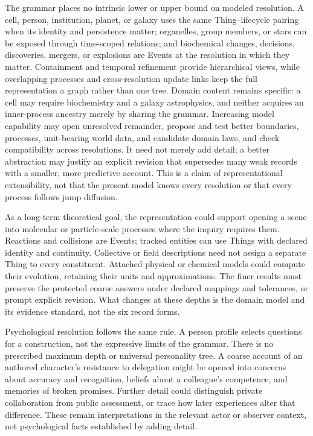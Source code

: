 \documentclass[11pt,a4paper]{article}
\begin{document}
The grammar places no intrinsic lower or upper bound on modeled resolution. A cell,
person, institution, planet, or galaxy uses the same Thing--lifecycle pairing
when its identity and persistence matter; organelles, group members, or stars
can be exposed through time-scoped relations; and biochemical changes,
decisions, discoveries, mergers, or explosions are Events at the resolution in
which they matter. Containment and temporal refinement provide hierarchical
views, while overlapping processes and cross-resolution update links keep the full
representation a graph rather than one tree. Domain content remains specific:
a cell may require biochemistry and a galaxy astrophysics, and neither acquires
an inner-process ancestry merely by sharing the grammar. Increasing model
capability may open unresolved remainder, propose and test better boundaries,
processes, unit-bearing world data, and candidate domain laws, and check compatibility across resolutions.
It need not merely add detail; a better abstraction may justify an explicit
revision that supersedes many weak records with a smaller, more predictive
account. This is a claim of representational extensibility,
not that the present model knows every resolution or that every process follows
jump diffusion.

As a long-term theoretical goal, the representation could support opening a
scene into molecular or particle-scale processes where the inquiry requires
them. Reactions and collisions are Events; tracked
entities can use Things with declared identity and continuity. Collective or
field descriptions need not assign a separate Thing to every constituent.
Attached physical or chemical models could compute their evolution, retaining
their units and approximations. The finer results must preserve the protected
coarse answers under declared mappings and tolerances, or prompt explicit
revision. What changes at these depths is the domain model and its evidence
standard, not the six record forms.

Psychological resolution follows the same rule. A person profile selects
questions for a construction, not the expressive limits of the grammar.
There is no prescribed maximum depth or universal personality tree. A coarse
account of an authored character's resistance to delegation might be opened
into concerns about accuracy and recognition, beliefs about a colleague's
competence, and memories of broken promises. Further detail could distinguish
private collaboration from public assessment, or trace how later experiences
alter that difference. These remain interpretations in the relevant actor or
observer context, not psychological facts established by adding detail.
\end{document}
